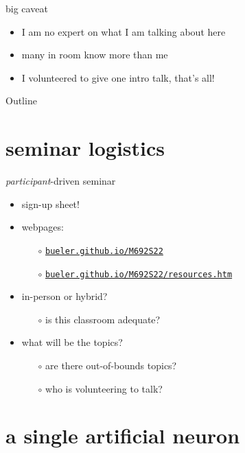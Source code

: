 \documentclass[xcolor={svgnames},
               hyperref={colorlinks,citecolor=DeepPink4,linkcolor=FireBrick,urlcolor=Maroon}]
               {beamer}
\begin{document}
\begin{frame}{big caveat}

\begin{itemize}
\item I am no expert on what I am talking about here
\item many in room know more than me
\item I volunteered to give one intro talk, that's all!
\end{itemize}
\end{frame}


\begin{frame}{Outline}
  \tableofcontents[hideallsubsections]
\end{frame}


\section{seminar logistics}

\begin{frame}{\emph{participant}-driven seminar}

\begin{itemize}
\item sign-up sheet!
\item webpages:
    \begin{itemize}
    \item[$\circ$] \href{http://bueler.github.io/M692S22/index.html}{\texttt{bueler.github.io/M692S22}}
    \item[$\circ$] \href{http://bueler.github.io/M692S22/resources.htm}{\texttt{bueler.github.io/M692S22/resources.htm}}
    \end{itemize}
\item in-person or hybrid?
    \begin{itemize}
    \item[$\circ$] is this classroom adequate?
    \end{itemize}
\item what will be the topics?
    \begin{itemize}
    \item[$\circ$] are there out-of-bounds topics?
    \item[$\circ$] who is volunteering to talk?
    \end{itemize}
\end{itemize}
\end{frame}


\section{a single artificial neuron}
\end{document}

